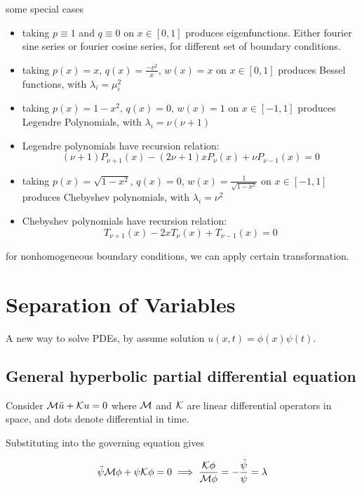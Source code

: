 \documentclass{article}
\begin{document}
\begin{remark}
    some special cases
    \begin{itemize}
        \item taking \(p\equiv 1\) and \(q\equiv 0\) on \(x\in[0,1]\)  produces eigenfunctions. Either fourier sine series or fourier cosine series, for different set of boundary conditions.
        \item taking \(p(x)=x\), \(q(x)=\frac{-\nu^2}{x}\), \(w(x)=x\) on \(x\in[0,1]\) produces Bessel functions, with \(\lambda_i=\mu_i^2\) 
        \item taking \(p(x)=1-x^2\), \(q(x)=0\), \(w(x)=1\) on \(x\in[-1,1]\) produces Legendre Polynomials, with \(\lambda_i=\nu(\nu+1)\)
        \item Legendre polynomials have recursion relation: 
        \[(\nu+1)P_{\nu+1}(x)-(2\nu+1)xP_\nu(x)+\nu P_{\nu-1}(x)=0\]
        \item taking \(p(x)=\sqrt{1-x^2}\), \(q(x)=0\), \(w(x)=\frac{1}{\sqrt{1-x^2}}\) on \(x\in[-1,1]\) produces Chebyshev polynomials, with \(\lambda_i=\nu^2\)
        \item Chebyshev polynomials have recursion relation:
        \[T_{\nu+1}(x)-2xT_\nu(x)+T_{\nu-1}(x)=0\]
    \end{itemize}
\end{remark}

\begin{remark}
    for nonhomogeneous boundary conditions, we can apply certain transformation.
\end{remark}

\section{Separation of Variables}

A new way to solve PDEs, by assume solution \(u(x,t)=\phi(x)\psi(t)\).

\subsection{General hyperbolic partial differential equation}

Consider \(\mathcal{M} \ddot u+\mathcal{K} u=0\) where \(\mathcal{M}\) and \(\mathcal{K}\) are linear differential operators in space, and dots denote differential in time.

Substituting into the governing equation gives

\[\ddot \psi \mathcal{M} \phi + \psi\mathcal{K} \phi=0\implies \frac{\mathcal{K} \phi}{\mathcal{M} \phi}=-\frac{\ddot\psi}{\psi}=\lambda\]
\end{document}
